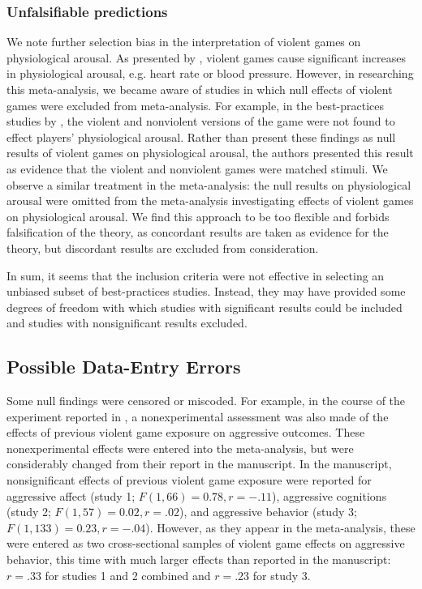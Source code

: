 \documentclass[man]{apa6}
\begin{document}
\subsubsection{Unfalsifiable predictions}
We note further selection bias in the interpretation of violent games on physiological arousal. As presented by \citet{Anderson:etal:2010}, violent games cause significant increases in physiological arousal, e.g. heart rate or blood pressure. However, in researching this meta-analysis, we became aware of studies in which null effects of violent games were excluded from meta-analysis. For example, in the best-practices studies by \citet{Carnagey:Anderson:2005}, the violent and nonviolent versions of the game were not found to effect players' physiological arousal. Rather than present these findings as null results of violent games on physiological arousal, the authors presented this result as evidence that the violent and nonviolent games were matched stimuli. We observe a similar treatment in the meta-analysis: the null results on physiological arousal were omitted from the meta-analysis investigating effects of violent games on physiological arousal. We find this approach to be too flexible and forbids falsification of the theory, as concordant results are taken as evidence for the theory, but discordant results are excluded from consideration.

In sum, it seems that the inclusion criteria were not effective in selecting an unbiased subset of best-practices studies. Instead, they may have provided some degrees of freedom with which studies with significant results could be included and studies with nonsignificant results excluded. %

\subsection{Possible Data-Entry Errors}
Some null findings were censored or miscoded. %
For example, in the course of the experiment reported in \citet{Carnagey:Anderson:2005}, a nonexperimental assessment was also made of the effects of previous violent game exposure on aggressive outcomes. These nonexperimental effects were entered into the \citet{Anderson:etal:2010} meta-analysis, but were considerably changed from their report in the \citet{Carnagey:Anderson:2005} manuscript.  In the manuscript, nonsignificant effects of previous violent game exposure were reported for aggressive affect (study 1; $F(1, 66) = 0.78, r = -.11$), aggressive cognitions (study 2; $F(1, 57) = 0.02, r = .02$), and aggressive behavior (study 3; $F(1, 133) = 0.23, r = -.04$). However, as they appear in the meta-analysis, these were entered as two cross-sectional samples of violent game effects on aggressive behavior, this time with much larger effects than reported in the manuscript: $r = .33$ for studies 1 and 2 combined and $r = .23$ for study 3.
\end{document}
